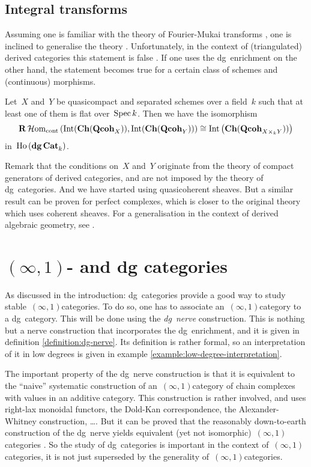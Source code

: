 \subsection{Integral transforms}
Assuming one is familiar with the theory of Fourier-Mukai transforms \cite{huybrechts}, one is inclined to generalise the theory \cite[conjecture 6.4]{caldararu}. Unfortunately, in the context of (triangulated) derived categories this statement is false \cite[example 6.5]{caldararu}. If one uses the dg~enrichment on the other hand, the statement becomes true for a certain class of schemes and (continuous) morphisms.
\begin{theorem}
  \label{theorem:integral-transforms}
  Let~$X$ and~$Y$ be quasicompact and separated schemes over a field~$k$ such that at least one of them is flat over~$\operatorname{Spec} k$. Then we have the isomorphism
  \begin{equation}
    \mathbf{R}\operatorname{\mathcal{H}om}_{\mathrm{cont}}\left( \operatorname{Int}(\mathbf{Ch}(\mathbf{Qcoh}_X)),\operatorname{Int}(\mathbf{Ch}(\mathbf{Qcoh}_Y)) \right)\cong\operatorname{Int}\left( \mathbf{Ch}(\mathbf{Qcoh}_{X\times_kY})) \right)
  \end{equation}
  in~$\mathrm{Ho} \,(\mathbf{dg\,Cat}_k)$.
\end{theorem}
Remark that the conditions on~$X$ and~$Y$ originate from the theory of compact generators of derived categories, and are not imposed by the theory of dg~categories. And we have started using quasicoherent sheaves. But a similar result can be proven for perfect complexes, which is closer to the original theory which uses coherent sheaves. For a generalisation in the context of derived algebraic geometry, see \cite{ben-zvi}.


\section{\texorpdfstring{$(\infty,1)$-}{(oo,1)-} and dg categories}
As discussed in the introduction: dg~categories provide a good way to study stable~$(\infty,1)$\dash categories. To do so, one has to associate an~$(\infty,1)$\dash category to a dg~category. This will be done using the \emph{dg~nerve} construction. This is nothing but a nerve construction that incorporates the dg~enrichment, and it is given in definition \ref{definition:dg-nerve}. Its definition is rather formal, so an interpretation of it in low degrees is given in example \ref{example:low-degree-interpretation}.

The important property of the dg~nerve construction is that it is equivalent to the ``naive'' systematic construction of an~$(\infty,1)$\dash category of chain complexes with values in an additive category. This construction is rather involved, and uses right-lax monoidal functors, the Dold-Kan correspondence, the Alexander-Whitney construction, \ldots. But it can be proved that the reasonably down-to-earth construction of the dg~nerve yields equivalent (yet not isomorphic)~$(\infty,1)$\dash categories \cite[proposition 1.3.1.17]{ha}. So the study of dg~categories is important in the context of~$(\infty,1)$\dash categories, it is not just superseded by the generality of~$(\infty,1)$\dash categories.

